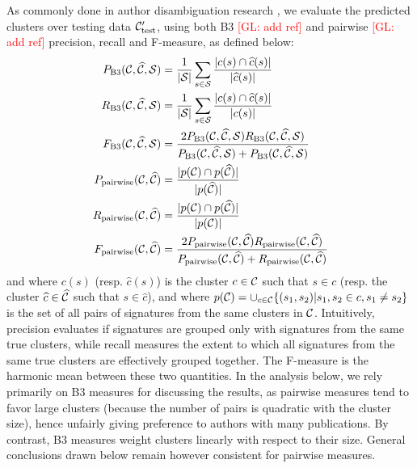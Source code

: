 \documentclass{article}
\newcommand{\glnote}[1]{\textcolor{red}{[GL: #1]}}
\begin{document}
As commonly done in author disambiguation research \citep{levin2012citation},
we evaluate the predicted clusters over testing data  ${\cal C}_\text{test}^\prime$,
using both B3 \glnote{add ref} and pairwise \glnote{add ref} precision, recall
and F-measure, as defined below:
\begin{align}
P_\text{B3}({\cal C}, \widehat{\cal C}, {\cal S}) &= \frac{1}{|{\cal S}|} \sum_{s \in {\cal S}} \frac{|c(s) \cap \widehat{c}(s)|}{|\widehat{c}(s)|} \\
R_\text{B3}({\cal C}, \widehat{\cal C}, {\cal S}) &= \frac{1}{|{\cal S}|} \sum_{s \in {\cal S}} \frac{|c(s) \cap \widehat{c}(s)|}{|c(s)|}\\
F_\text{B3}({\cal C}, \widehat{\cal C}, {\cal S}) &= \frac{2 P_\text{B3}({\cal C}, \widehat{\cal C}, {\cal S}) R_\text{B3}({\cal C}, \widehat{\cal C}, {\cal S})}{P_\text{B3}({\cal C}, \widehat{\cal C}, {\cal S}) + P_\text{B3}({\cal C}, \widehat{\cal C}, {\cal S})}\\
P_\text{pairwise}({\cal C}, \widehat{\cal C}) &= \frac{|p({\cal C}) \cap p(\widehat{\cal C})|}{|p(\widehat{\cal C})|}\\
R_\text{pairwise}({\cal C}, \widehat{\cal C}) &= \frac{|p({\cal C}) \cap p(\widehat{\cal C})|}{|p({\cal C})|}\\
F_\text{pairwise}({\cal C}, \widehat{\cal C}) &= \frac{2 P_\text{pairwise}({\cal C}, \widehat{\cal C}) R_\text{pairwise}({\cal C}, \widehat{\cal C})}{P_\text{pairwise}({\cal C}, \widehat{\cal C}) + R_\text{pairwise}({\cal C}, \widehat{\cal C})}
\end{align}
and where $c(s)$ (resp. $\widehat{c}(s)$) is the cluster $c \in {\cal C}$ such that
$s \in c$ (resp. the cluster $\widehat{c} \in \widehat{\cal C}$ such that $s
\in \widehat{c}$), and where $p({\cal C}) = \cup_{c \in {\cal C}} \{ (s_1, s_2)
| s_1, s_2 \in c, s_1 \neq s_2 \}$ is the set of all pairs of signatures from
the same clusters in ${\cal C}$. Intuitively, precision evaluates if signatures
are grouped only with signatures from the same true clusters, while recall
measures the extent to which all signatures from the same true clusters are
effectively grouped together. The F-measure is the harmonic mean between these
two quantities. In the analysis below, we rely primarily on B3 measures for discussing
the results, as pairwise measures tend to favor large clusters (because the number of pairs is quadratic with the cluster size),
hence unfairly giving preference to authors with many publications. By contrast,
B3 measures weight clusters linearly with respect to their size. General conclusions
drawn below remain however consistent for pairwise measures.
\end{document}
